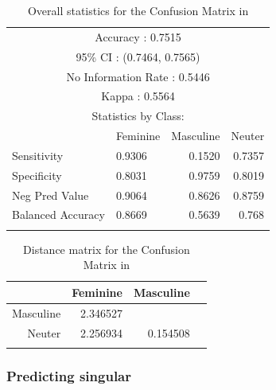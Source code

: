 \begin{table}[p]
  \centering
  \begin{tabular}{llrr}
    \lsptoprule
    \multicolumn{4}{c}{Overall statistics:} \\

    \midrule
    \multicolumn{4}{c}{Accuracy : 0.7515}                                  \\
    \multicolumn{4}{c}{95\% CI : (0.7464, 0.7565)}                         \\
    \multicolumn{4}{c}{No Information Rate : 0.5446}                       \\
    \multicolumn{4}{c}{Kappa : 0.5564}                                     \\
    \midrule
    \multicolumn{4}{c}{Statistics by Class:}                               \\
    \midrule
                      & Feminine & Masculine & Neuter \\
    Sensitivity       & 0.9306          & 0.1520           & 0.7357        \\
    Specificity       & 0.8031          & 0.9759           & 0.8019        \\
    Neg Pred Value    & 0.9064          & 0.8626           & 0.8759        \\
    Balanced Accuracy & 0.8669          & 0.5639           & 0.768         \\
    \lspbottomrule
  \end{tabular}
  \caption{Overall statistics for the Confusion Matrix in }\label{tab:gender-romanian-stats}
\end{table}

\begin{table}
  \centering
  \begin{tabular}{rrrr}
    \lsptoprule
              & Feminine & Masculine \\
    \midrule
    Masculine & 2.346527 &           \\
    Neuter    & 2.256934 & 0.154508  \\
    \lspbottomrule
  \end{tabular}
  \caption{Distance matrix for the Confusion Matrix in }\label{tab:gender-romanian-distance}
\end{table}

\subsubsection{Predicting singular}

